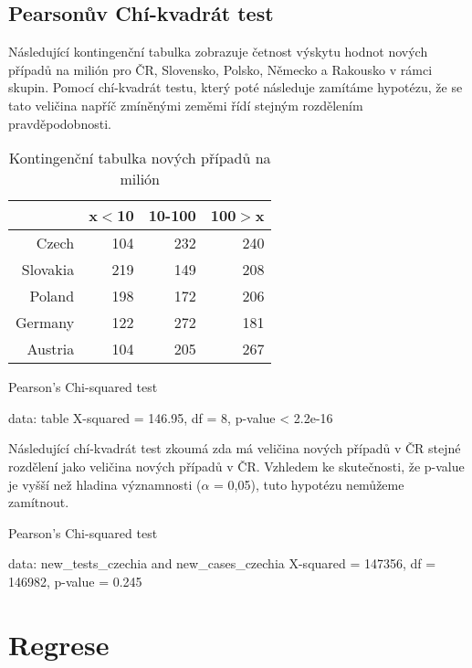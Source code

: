 \documentclass[a4paper, 12pt]{article}
\begin{document}
\subsection{Pearsonův Chí-kvadrát test}

Následující kontingenční tabulka zobrazuje četnost výskytu hodnot nových případů na milión
pro ČR, Slovensko, Polsko, Německo a Rakousko v rámci skupin. Pomocí chí-kvadrát testu,
který poté následuje zamítáme hypotézu, že se tato veličina napříč zmíněnými zeměmi
řídí stejným rozdělením pravděpodobnosti.

\begin{table}[ht]
\centering
\begin{tabular}{rrrr}
  \hline
 & x$<$10 & 10-100 & 100$>$x \\ 
  \hline
Czech & 104 & 232 & 240 \\ 
  Slovakia & 219 & 149 & 208 \\ 
  Poland & 198 & 172 & 206 \\ 
  Germany & 122 & 272 & 181 \\ 
  Austria & 104 & 205 & 267 \\ 
   \hline
\end{tabular}
\caption{Kontingenční tabulka nových případů na milión} 
\label{table:popisStat}
\end{table}
\begin{Schunk}
\begin{Soutput}
	Pearson's Chi-squared test

data:  table
X-squared = 146.95, df = 8, p-value < 2.2e-16
\end{Soutput}
\end{Schunk}

Následující chí-kvadrát test zkoumá zda má veličina nových případů v ČR stejné
rozdělení jako veličina nových případů v ČR. Vzhledem ke skutečnosti, že p-value je vyšší
než hladina významnosti ($\alpha$ = 0,05), tuto hypotézu nemůžeme zamítnout.

\begin{Schunk}
\begin{Soutput}
	Pearson's Chi-squared test

data:  new_tests_czechia and new_cases_czechia
X-squared = 147356, df = 146982, p-value = 0.245
\end{Soutput}
\end{Schunk}

\section{Regrese}
\end{document}
